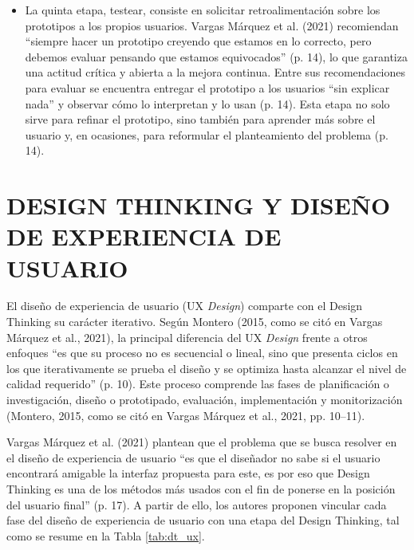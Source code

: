 \begin{itemize}
    \item La quinta etapa, testear, consiste en solicitar retroalimentación sobre los prototipos a los propios usuarios. Vargas Márquez et al. (2021) recomiendan ``siempre hacer un prototipo creyendo que estamos en lo correcto, pero debemos evaluar pensando que estamos equivocados'' (p. 14), lo que garantiza una actitud crítica y abierta a la mejora continua. Entre sus recomendaciones para evaluar se encuentra entregar el prototipo a los usuarios ``sin explicar nada'' y observar cómo lo interpretan y lo usan (p. 14). Esta etapa no solo sirve para refinar el prototipo, sino también para aprender más sobre el usuario y, en ocasiones, para reformular el planteamiento del problema (p. 14).
\end{itemize}

\section{DESIGN THINKING Y DISEÑO DE EXPERIENCIA DE USUARIO}
El diseño de experiencia de usuario (UX \textit{Design}) comparte con el Design Thinking su carácter iterativo. Según Montero (2015, como se citó en Vargas Márquez et al., 2021), la principal diferencia del UX \textit{Design} frente a otros enfoques ``es que su proceso no es secuencial o lineal, sino que presenta ciclos en los que iterativamente se prueba el diseño y se optimiza hasta alcanzar el nivel de calidad requerido'' (p. 10). Este proceso comprende las fases de planificación o investigación, diseño o prototipado, evaluación, implementación y monitorización (Montero, 2015, como se citó en Vargas Márquez et al., 2021, pp. 10--11).

Vargas Márquez et al. (2021) plantean que el problema que se busca resolver en el diseño de experiencia de usuario ``es que el diseñador no sabe si el usuario encontrará amigable la interfaz propuesta para este, es por eso que Design Thinking es una de los métodos más usados con el fin de ponerse en la posición del usuario final'' (p. 17). A partir de ello, los autores proponen vincular cada fase del diseño de experiencia de usuario con una etapa del Design Thinking, tal como se resume en la Tabla \ref{tab:dt_ux}.


